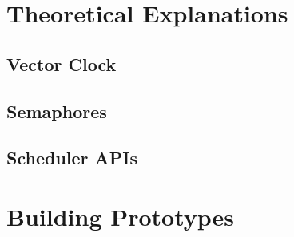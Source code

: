 \section{Theoretical Explanations}
\subsection{Vector Clock}
\subsection{Semaphores}
\subsection{Scheduler APIs}

\section{Building Prototypes}